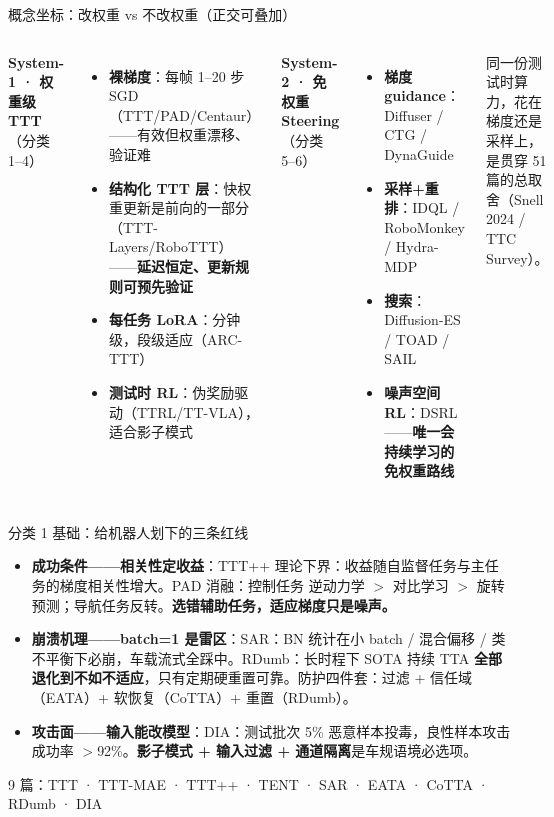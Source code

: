 \documentclass[10pt,aspectratio=169]{beamer}
\newcommand{\hl}[1]{\textcolor{good}{\textbf{#1}}}
\newcommand{\wa}[1]{\textcolor{warn}{\textbf{#1}}}
\newcommand{\ba}[1]{\textcolor{bad}{\textbf{#1}}}
\begin{document}
\begin{frame}{概念坐标：改权重 vs 不改权重（正交可叠加）}
\begin{columns}[T]
\textbf{System-1 · 权重级 TTT}（分类 1--4）
\begin{itemize}
\item \textbf{裸梯度}：每帧 1--20 步 SGD（TTT/PAD/Centaur）——有效但权重漂移、验证难
\item \textbf{结构化 TTT 层}：快权重更新是前向的一部分（TTT-Layers/RoboTTT）——\hl{延迟恒定、更新规则可预先验证}
\item \textbf{每任务 LoRA}：分钟级，段级适应（ARC-TTT）
\item \textbf{测试时 RL}：伪奖励驱动（TTRL/TT-VLA），适合影子模式
\end{itemize}
\textbf{System-2 · 免权重 Steering}（分类 5--6）
\begin{itemize}
\item \textbf{梯度 guidance}：Diffuser / CTG / DynaGuide
\item \textbf{采样+重排}：IDQL / RoboMonkey / Hydra-MDP
\item \textbf{搜索}：Diffusion-ES / TOAD / SAIL
\item \textbf{噪声空间 RL}：DSRL——\hl{唯一会持续学习的免权重路线}
\end{itemize}
\vspace{4pt}
\footnotesize 同一份测试时算力，花在梯度还是采样上，是贯穿 51 篇的总取舍（Snell 2024 / TTC Survey）。
\end{columns}
\end{frame}

\begin{frame}{分类 1 基础：给机器人划下的三条红线}
\begin{itemize}
\item \textbf{成功条件——相关性定收益}：TTT++ 理论下界：收益随自监督任务与主任务的梯度相关性增大。PAD 消融：控制任务 逆动力学 $>$ 对比学习 $>$ 旋转预测；导航任务反转。\hl{选错辅助任务，适应梯度只是噪声。}
\item \textbf{崩溃机理——batch=1 是雷区}：SAR：BN 统计在小 batch / 混合偏移 / 类不平衡下必崩，车载流式全踩中。RDumb：长时程下 SOTA 持续 TTA \ba{全部退化到不如不适应}，只有定期硬重置可靠。防护四件套：过滤 + 信任域（EATA）+ 软恢复（CoTTA）+ 重置（RDumb）。
\item \textbf{攻击面——输入能改模型}：DIA：测试批次 5\% 恶意样本投毒，良性样本攻击成功率 $>$92\%。\wa{影子模式 + 输入过滤 + 通道隔离}是车规语境必选项。
\end{itemize}
\vspace{4pt}
\footnotesize 9 篇：TTT · TTT-MAE · TTT++ · TENT · SAR · EATA · CoTTA · RDumb · DIA
\end{frame}
\end{document}
